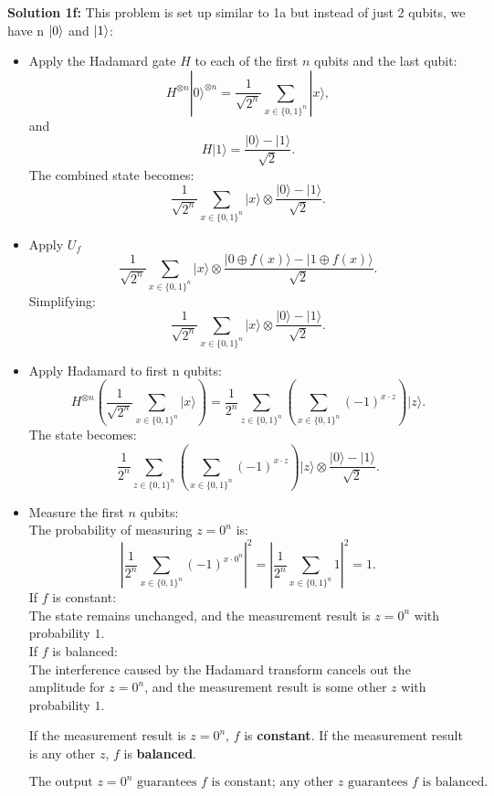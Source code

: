 \documentclass{article}
\begin{document}
\textbf{Solution 1f:} This problem is set up similar to 1a but instead of just 2 qubits, we have n $\ket{0}$ and $\ket{1}$:
\begin{itemize}
    \item Apply the Hadamard gate \( H \) to each of the first \( n \) qubits and the last qubit:
     $$H^{\otimes n} |0\rangle^{\otimes n} = \frac{1}{\sqrt{2^n}} \sum_{x \in \{0,1\}^n} |x\rangle,$$
     and
     $$H|1\rangle = \frac{|0\rangle - |1\rangle}{\sqrt{2}}.$$
    The combined state becomes:
     $$\frac{1}{\sqrt{2^n}} \sum_{x \in \{0,1\}^n} |x\rangle \otimes \frac{|0\rangle - |1\rangle}{\sqrt{2}}.$$
    \item Apply $U_f$
    $$\frac{1}{\sqrt{2^n}} \sum_{x \in \{0,1\}^n} |x\rangle \otimes \frac{|0 \oplus f(x)\rangle - |1 \oplus f(x)\rangle}{\sqrt{2}}.$$
    Simplifying:
    $$\frac{1}{\sqrt{2^n}} \sum_{x \in \{0,1\}^n} |x\rangle \otimes \frac{|0\rangle - |1\rangle}{\sqrt{2}}.$$
    \item Apply Hadamard to first n qubits:
     $$H^{\otimes n} \left( \frac{1}{\sqrt{2^n}} \sum_{x \in \{0,1\}^n} |x\rangle \right) = \frac{1}{2^n} \sum_{z \in \{0,1\}^n} \left( \sum_{x \in \{0,1\}^n} (-1)^{x \cdot z} \right) |z\rangle.$$
    The state becomes:
     $$\frac{1}{2^n} \sum_{z \in \{0,1\}^n} \left( \sum_{x \in \{0,1\}^n} (-1)^{x \cdot z} \right) |z\rangle \otimes \frac{|0\rangle - |1\rangle}{\sqrt{2}}.$$  
     \item Measure the first $n$ qubits:\\
     The probability of measuring \( z = 0^n \) is:
     \[
     \left| \frac{1}{2^n} \sum_{x \in \{0,1\}^n} (-1)^{x \cdot 0^n} \right|^2 = \left| \frac{1}{2^n} \sum_{x \in \{0,1\}^n} 1 \right|^2 = 1.
     \]
    If \( f \) is constant:\\
     The state remains unchanged, and the measurement result is \( z = 0^n \) with probability \( 1 \).\\
    If \( f \) is balanced:\\
     The interference caused by the Hadamard transform cancels out the amplitude for \( z = 0^n \), and the measurement result is some other \( z \) with probability \( 1 \).

    If the measurement result is \( z = 0^n \), \( f \) is \textbf{constant}.
    If the measurement result is any other \( z \), \( f \) is \textbf{balanced}.

\[
\boxed{\text{The output } z = 0^n \text{ guarantees } f \text{ is constant; any other } z \text{ guarantees } f \text{ is balanced.}}
\]
  
\end{itemize}
\end{document}
